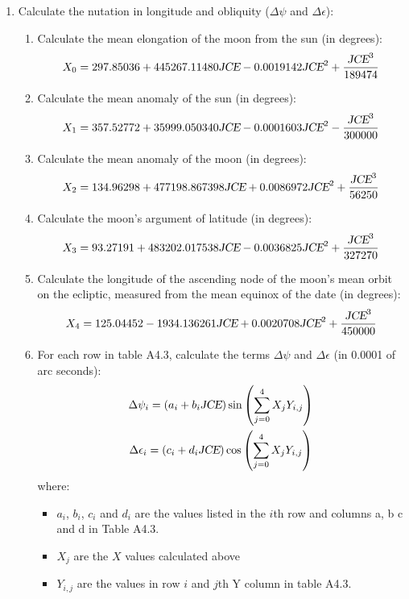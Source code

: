 {\begin{enumerate}
\item Calculate the nutation in longitude and obliquity ($\Delta \psi$ and $\Delta \epsilon$):
  \begin{enumerate}
  \item Calculate the mean elongation of the moon from the sun (in degrees):
      \begin{displaymath}
      X_0 = 297.85036 + 445267.11480 \text{\sl JCE} - 0.0019142 \text{\sl JCE}^2 + \frac{\text{\sl JCE}^3}{189474}
      \end{displaymath}

    \item Calculate the mean anomaly of the sun (in degrees):
      \begin{displaymath}
	X_1 = 357.52772 + 35999.050340 \text{\sl JCE} - 0.0001603 \text{\sl JCE}^2 - \frac{\text{\sl JCE}^3}{300000}
      \end{displaymath}

    \item Calculate the mean anomaly of the moon (in degrees):
      \begin{displaymath}
      X_2 = 134.96298 + 477198.867398 \text{\sl JCE} + 0.0086972 \text{\sl JCE}^2 + \frac{\text{\sl JCE}^3}{56250}
      \end{displaymath}

    \item Calculate the moon's argument of latitude (in degrees):
      \begin{displaymath}
      X_3 = 93.27191 + 483202.017538 \text{\sl JCE} - 0.0036825 \text{\sl JCE}^2 + \frac{\text{\sl JCE}^3}{327270}
      \end{displaymath}

    \item Calculate the longitude of the ascending node of the moon's mean orbit on the ecliptic,
	  measured from the mean equinox of the date (in degrees):
	\begin{displaymath}
	X_4 = 125.04452 - 1934.136261 \text{\sl JCE} + 0.0020708 \text{\sl JCE}^2 + \frac{\text{\sl JCE}^3}{450000}
	\end{displaymath}

    \item For each row in table A4.3, calculate the terms $\Delta \psi$ and $\Delta \epsilon$ (in
	  0.0001 of arc seconds):
	\begin{gather*}
	\Delta \psi_i = (a_i + b_i \text{\sl JCE}) \sin{\left(\sum \limits_{j=0}^4 X_j Y_{i, j}\right)} \\
	\Delta \epsilon_i = (c_i + d_i \text{\sl JCE}) \cos{\left(\sum \limits_{j=0}^4 X_j Y_{i, j}\right)} 
	\end{gather*}
      where:
	\begin{itemize}
	  \item $a_i$, $b_i$, $c_i$ and $d_i$ are the values listed in the $i$th row and columns a, b
		c and d in Table A4.3.
	  \item $X_j$ are the $X$ values calculated above
	  \item $Y_{i, j}$ are the values in row $i$ and $j$th Y column in table A4.3. 
	\end{itemize}


\end{enumerate}
\end{enumerate}}
